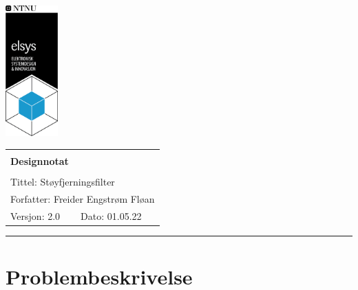 \documentclass[a4paper,11pt,norsk]{article}
\begin{document}
\begin{minipage}[c]{0.15\textwidth}
\includegraphics[width=2.0cm]{D1/Images/elsys_pos_staaende_ntnu.png}  
\end{minipage}
\begin{minipage}[c]{0.85\textwidth}

\renewcommand{\arraystretch}{1.7}
\large 
\begin{tabularx}{\textwidth}{|X|X|}
\hline
\multicolumn{2}{|l|}{} \\
\multicolumn{2}{|l|}{\huge \textbf{Designnotat}} \\
\multicolumn{2}{|l|}{}  \\
\hline
\multicolumn{2}{|l|}{Tittel: 
Støyfjerningsfilter
} \\
\hline
\multicolumn{2}{|l|}{Forfatter: 
Freider Engstrøm Fløan
} \\
\hline
Versjon: 2.0 & Dato: 01.05.22
\\
\hline 
\end{tabularx}
\end{minipage}
\normalsize


\setlength{\parskip}{0ex}
\renewcommand{\baselinestretch}{0.1}\normalsize
\tableofcontents
\renewcommand{\baselinestretch}{1.00}\normalsize
\setlength{\parskip}{2ex}
\rule{\textwidth}{1pt}
\label{sec:innledning}

\newpage



\section{Problembeskrivelse}
\label{sec:problembeskrivelse}
\end{document}
